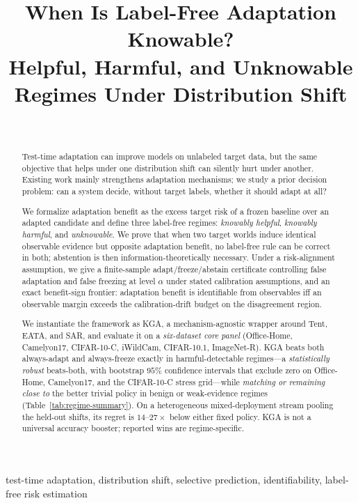 \documentclass[conference]{IEEEtran}
\title{When Is Label-Free Adaptation Knowable? \\
Helpful, Harmful, and Unknowable Regimes Under Distribution Shift}
\author{\IEEEauthorblockN{Anonymous Authors}\\
\IEEEauthorblockA{Paper under double-blind review}}
\theoremstyle{plain}
\theoremstyle{definition}
\theoremstyle{remark}
\begin{document}
\maketitle

\begin{abstract}
Test-time adaptation can improve models on unlabeled target data, but the same
objective that helps under one distribution shift can silently hurt under another.
Existing work mainly strengthens adaptation mechanisms; we study a prior decision
problem: can a system decide, without target labels, whether it should adapt at all?

We formalize adaptation benefit as the excess target risk of a frozen baseline over
an adapted candidate and define three label-free regimes: \emph{knowably helpful},
\emph{knowably harmful}, and \emph{unknowable}. We prove that when two target worlds
induce identical observable evidence but opposite adaptation benefit, no label-free
rule can be correct in both; abstention is then information-theoretically necessary.
Under a risk-alignment assumption, we give a finite-sample adapt/freeze/abstain
certificate controlling false adaptation and false freezing at level $\alpha$ under
stated calibration assumptions, and an exact benefit-sign frontier: adaptation benefit
is identifiable from observables iff an observable margin exceeds the calibration-drift
budget on the disagreement region.

We instantiate the framework as \textsc{KGA}, a mechanism-agnostic wrapper around
Tent, EATA, and SAR, and evaluate it on a \emph{six-dataset core panel} (Office-Home,
Camelyon17, CIFAR-10-C, iWildCam, CIFAR-10.1, ImageNet-R). \textsc{KGA} beats both
always-adapt and always-freeze exactly in harmful-detectable regimes---a
\emph{statistically robust} beats-both, with bootstrap $95\%$ confidence intervals that
exclude zero on Office-Home, Camelyon17, and the CIFAR-10-C stress grid---while
\emph{matching or remaining close to} the better trivial policy in benign or weak-evidence
regimes (Table~\ref{tab:regime-summary}). On a heterogeneous mixed-deployment stream pooling
the held-out shifts, its regret is $14$--$27\times$ below either fixed policy. \textsc{KGA}
is not a universal accuracy booster; reported wins are regime-specific.
\end{abstract}

\begin{IEEEkeywords}
test-time adaptation, distribution shift, selective prediction, identifiability, label-free risk estimation
\end{IEEEkeywords}
\end{document}
